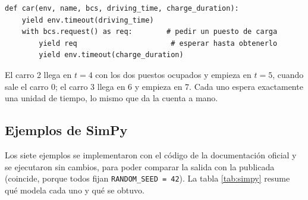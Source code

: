 \documentclass[11pt,letterpaper]{article}
\begin{document}
\begin{lstlisting}
def car(env, name, bcs, driving_time, charge_duration):
    yield env.timeout(driving_time)
    with bcs.request() as req:        # pedir un puesto de carga
        yield req                      # esperar hasta obtenerlo
        yield env.timeout(charge_duration)
\end{lstlisting}

El carro 2 llega en $t = 4$ con los dos puestos ocupados y empieza en $t = 5$, cuando sale el carro 0; el carro 3
llega en 6 y empieza en 7. Cada uno espera exactamente una unidad de tiempo, lo mismo que da la cuenta a mano.

\subsection{Ejemplos de SimPy}

Los siete ejemplos se implementaron con el código de la documentación oficial y se ejecutaron sin cambios, para
poder comparar la salida con la publicada (coincide, porque todos fijan \texttt{RANDOM\_SEED = 42}). La tabla
\ref{tab:simpy} resume qué modela cada uno y qué se obtuvo.
\end{document}
